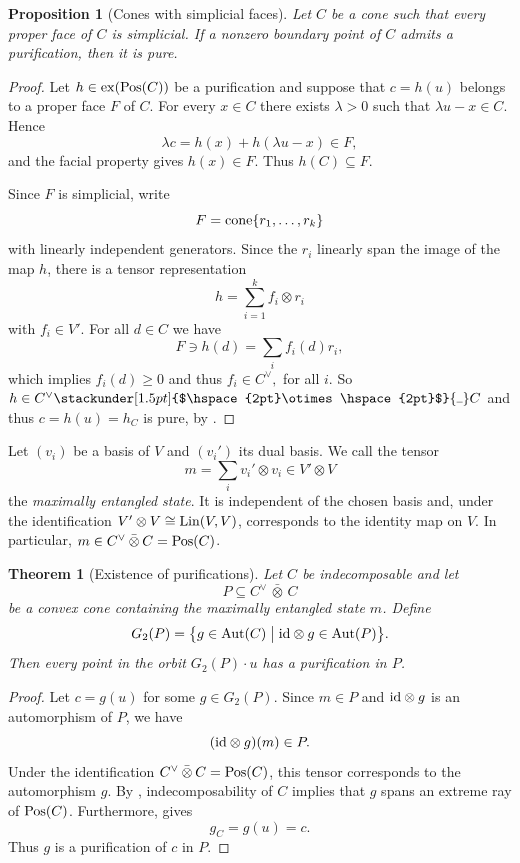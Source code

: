 \documentclass[11pt]{article}
\newcommand\barbelow[1]{\stackunder[1.5pt]{$\hspace{2pt}#1\hspace{2pt}$}{\rule{1ex}{0.075ex}}}
\newcommand{\barabove}[1]{\hspace{2pt}\bar{#1}\hspace{2pt}}
\theoremstyle{result}
\newtheorem{theorem}{Theorem}[section]
\newtheorem{proposition}[proposition]{Proposition}
\theoremstyle{discussion}
\newcommand{\omin}{\barbelow{\otimes}}
\newcommand{\omax}{\barabove{\otimes}}
\begin{document}
\begin{proposition}[Cones with simplicial faces]
\label{prop:poly}
    Let $C$ be a cone such that every proper face of $C$ is
    simplicial. If  a nonzero boundary point of $C$ admits a purification, then it is pure.
\end{proposition}

\begin{proof}
    Let $h\in{\rm ex}({\rm Pos}(C))$ be a purification and suppose that
    $c=h(u)$ belongs to a proper face $F$ of $C$. For every $x\in C$ there
    exists $\lambda>0$ such that $\lambda u-x\in C$. Hence
    \[
        \lambda c=h(x)+h(\lambda u-x)\in F,
    \]
    and the facial property gives $h(x)\in F$. Thus $h(C)\subseteq F$.

    Since $F$ is simplicial, write
    \[
        F={\rm cone}\{r_1,\ldots,r_k\}
    \]
    with linearly independent generators. Since the $r_i$ linearly span the image of the map $h$, there is a tensor representation 
    $$ 
        h=\sum_{i=1}^k f_i\otimes r_i
    $$
    with $f_i\in V'.$ For all $d\in C$ we have
    $$
    F\ni h(d)=\sum_i f_i(d)r_i,
    $$
    which implies $f_i(d)\geqslant 0$ and thus $f_i\in C^\vee,$ for all $i$. So $h\in C^\vee\omin C$ and thus $c=h(u)=h_C$ is pure, by .
\end{proof}

Let $(v_i)$ be a basis of $V$ and $(v_i')$ its dual basis. We call the
tensor
\[
    m=\sum_i v_i'\otimes v_i\in V'\otimes V
\]
the \emph{maximally entangled state}. It is independent of the chosen basis
and, under the identification
$V'\otimes V\cong{\rm Lin}(V,V)$, corresponds to the identity map on $V$. In particular, $m\in C^\vee\omax C={\rm Pos}(C)$.

\begin{theorem}[Existence of purifications]
\label{cor:hompuri}
    Let $C$ be indecomposable and let
    \[
        P\subseteq C^\vee\omax C
    \]
    be a convex cone containing the maximally entangled state $m$. Define
    \[
        G_2(P)=\bigl\{g\in{\rm Aut}(C)\bigm|
        {\rm id}\otimes g\in{\rm Aut}(P)\bigr\}.
    \]
    Then every point in the orbit $G_2(P)\cdot u$ has a purification in $P$.
\end{theorem}

\begin{proof}
    Let $c=g(u)$ for some $g\in G_2(P)$. Since $m\in P$ and
    ${\rm id}\otimes g$ is an automorphism of $P$, we have
    \[
        ({\rm id}\otimes g)(m)\in P.
    \]
    Under the identification $C^\vee\omax C={\rm Pos}(C)$, this tensor
    corresponds to the automorphism $g$. By
    , indecomposability of $C$ implies that
    $g$ spans an extreme ray of ${\rm Pos}(C)$. Furthermore,
     gives
    \[
        g_C=g(u)=c.
    \]
    Thus $g$ is a purification of $c$ in $P$.
\end{proof}
\end{document}

